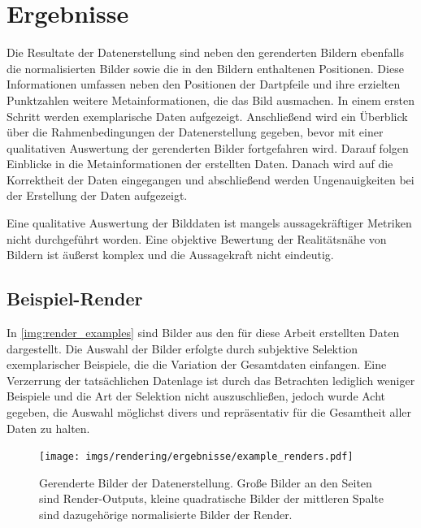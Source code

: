 
\section{Ergebnisse}
\label{sec:daten:ergebnisse}

Die Resultate der Datenerstellung sind neben den gerenderten Bildern ebenfalls die normalisierten Bilder sowie die in den Bildern enthaltenen Positionen. Diese Informationen umfassen neben den Positionen der Dartpfeile und ihre erzielten Punktzahlen weitere Metainformationen, die das Bild ausmachen. In einem ersten Schritt werden exemplarische Daten aufgezeigt. Anschließend wird ein Überblick über die Rahmenbedingungen der Datenerstellung gegeben, bevor mit einer qualitativen Auswertung der gerenderten Bilder fortgefahren wird. Darauf folgen Einblicke in die Metainformationen der erstellten Daten. Danach wird auf die Korrektheit der Daten eingegangen und abschließend werden Ungenauigkeiten bei der Erstellung der Daten aufgezeigt.

Eine qualitative Auswertung der Bilddaten ist mangels aussagekräftiger Metriken nicht durchgeführt worden. Eine objektive Bewertung der Realitätsnähe von Bildern ist äußerst komplex und die Aussagekraft nicht eindeutig.


\subsection{Beispiel-Render}  %
\label{sec:render_beispiel}

In \autoref{img:render_examples} sind Bilder aus den für diese Arbeit erstellten Daten dargestellt. Die Auswahl der Bilder erfolgte durch subjektive Selektion exemplarischer Beispiele, die die Variation der Gesamtdaten einfangen. Eine Verzerrung der tatsächlichen Datenlage ist durch das Betrachten lediglich weniger Beispiele und die Art der Selektion nicht auszuschließen, jedoch wurde Acht gegeben, die Auswahl möglichst divers und repräsentativ für die Gesamtheit aller Daten zu halten.

\begin{figure}
    \centering
    \texttt{[image: imgs/rendering/ergebnisse/example\_renders.pdf]}
    \caption{Gerenderte Bilder der Datenerstellung. Große Bilder an den Seiten sind Render-Outputs, kleine quadratische Bilder der mittleren Spalte sind dazugehörige normalisierte Bilder der Render.}
    \label{img:render_examples}
\end{figure}

